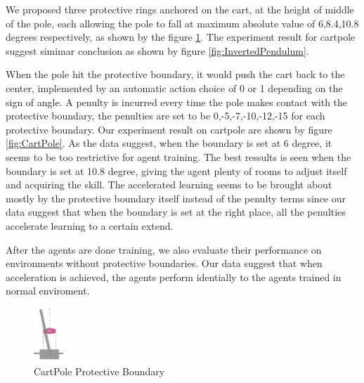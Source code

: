 \documentclass[journal]{IEEEtran}
\begin{document}
We proposed three protective rings anchored on the cart, at the height of middle of the pole, each allowing the pole to fall at maximum absolute value of 6,8.4,10.8 degrees respectively, as shown by the figure \ref{fig:cartpolePB}. The experiment result for cartpole suggest simimar conclusion as shown by figure \ref{fig:InvertedPendulum}.


When the pole hit the protective boundary, it would push the cart back to the center, implemented by an automatic action choice of 0 or 1 depending on the sign of angle. A penulty is incurred every time the pole makes contact with the protective boundary, the penulties are set to be 0,-5,-7,-10,-12,-15 for each protective boundary. Our experiment result on cartpole are shown by figure \ref{fig:CartPole}. As the data suggest, when the boundary is set at 6 degree, it seems to be too restrictive for agent training. The best ressults is seen when the boundary is set at 10.8 degree, giving the agent plenty of rooms to adjust itself and acquiring the skill. The accelerated learning seems to be brought about mostly by the protective boundary itself instead of the penulty terms since our data suggest that when the boundary is set at the right place, all the penulties accelerate learning to a certain extend.

After the agents are done training, we also evaluate their performance on environments without protective boundaries. Our data suggest that when acceleration is achieved, the agents perform identially to the agents trained in normal enviroment.

\begin{figure}
     \centering
      \includegraphics[width=0.1\textwidth]{cartpole1.png}
      \caption{CartPole Protective Boundary}
      \label{fig:cartpolePB}
\end{figure}
\end{document}

